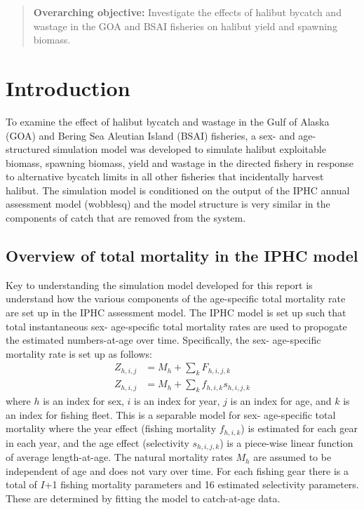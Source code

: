 

\begin{quote}
\textbf{Overarching objective:} Investigate the effects of halibut bycatch and wastage in the GOA and BSAI fisheries on halibut yield and spawning biomass.	
\end{quote}


\section{Introduction} %
\label{cha:introduction}

To examine the effect of halibut bycatch and wastage in the Gulf of Alaska (GOA) and Bering Sea Aleutian Island (BSAI) fisheries, a sex- and age-structured simulation model was developed to simulate halibut exploitable biomass, spawning biomass, yield and wastage in the directed fishery in response to alternative bycatch limits in all other fisheries that incidentally harvest halibut.  The simulation model is conditioned on the output of the IPHC annual assessment model (wobblesq) and the model structure is very similar in the components of catch that are removed from the system.  

\subsection{Overview of total mortality in the IPHC model} %
\label{sub:overview_of_the_iphc_model}

Key to understanding the simulation model developed for this report is understand how the various components of the age-specific total mortality rate are set up in the IPHC assessment model.  The IPHC model is set up such that total instantaneous sex- age-specific total mortality rates are used to propogate the estimated numbers-at-age over time.  Specifically, the sex- age-specific mortality rate is set up as follows:
\begin{align*}
	Z_{h,i,j} &= M_h + \sum_k F_{h,i,j,k}\\
	Z_{h,i,j} &= M_h + \sum_k f_{h,i,k} s_{h,i,j,k}
\end{align*}
where $h$ is an index for sex, $i$ is an index for year, $j$ is an index for age, and $k$ is an index for fishing fleet.  This is a separable model for sex- age-specific total mortality where the year effect (fishing mortality $f_{h,i,k}$) is estimated for each gear in each year, and the age effect (selectivity $s_{h,i,j,k}$) is a piece-wise linear function of average length-at-age. The natural mortality rates $M_h$ are assumed to be independent of age and does not vary over time.  For each fishing gear there is a total of $I$+1 fishing mortality parameters and  16 estimated selectivity parameters.  These are determined by fitting the model to catch-at-age data.

